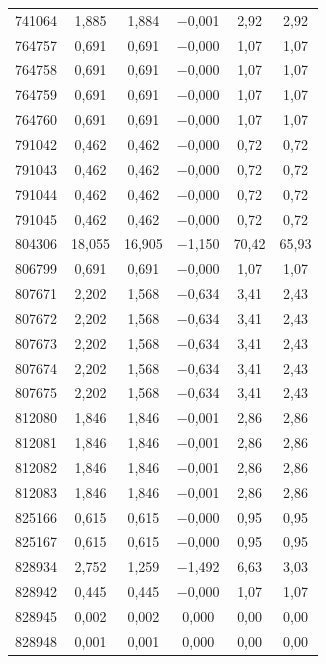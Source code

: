 \begin{longtable}{lccccc}
741064 & 1,885 & 1,884 & $-$0,001 & 2,92 & 2,92 \\
764757 & 0,691 & 0,691 & $-$0,000 & 1,07 & 1,07 \\
764758 & 0,691 & 0,691 & $-$0,000 & 1,07 & 1,07 \\
764759 & 0,691 & 0,691 & $-$0,000 & 1,07 & 1,07 \\
764760 & 0,691 & 0,691 & $-$0,000 & 1,07 & 1,07 \\
791042 & 0,462 & 0,462 & $-$0,000 & 0,72 & 0,72 \\
791043 & 0,462 & 0,462 & $-$0,000 & 0,72 & 0,72 \\
791044 & 0,462 & 0,462 & $-$0,000 & 0,72 & 0,72 \\
791045 & 0,462 & 0,462 & $-$0,000 & 0,72 & 0,72 \\
804306 & 18,055 & 16,905 & $-$1,150 & 70,42 & 65,93 \\
806799 & 0,691 & 0,691 & $-$0,000 & 1,07 & 1,07 \\
807671 & 2,202 & 1,568 & $-$0,634 & 3,41 & 2,43 \\
807672 & 2,202 & 1,568 & $-$0,634 & 3,41 & 2,43 \\
807673 & 2,202 & 1,568 & $-$0,634 & 3,41 & 2,43 \\
807674 & 2,202 & 1,568 & $-$0,634 & 3,41 & 2,43 \\
807675 & 2,202 & 1,568 & $-$0,634 & 3,41 & 2,43 \\
812080 & 1,846 & 1,846 & $-$0,001 & 2,86 & 2,86 \\
812081 & 1,846 & 1,846 & $-$0,001 & 2,86 & 2,86 \\
812082 & 1,846 & 1,846 & $-$0,001 & 2,86 & 2,86 \\
812083 & 1,846 & 1,846 & $-$0,001 & 2,86 & 2,86 \\
825166 & 0,615 & 0,615 & $-$0,000 & 0,95 & 0,95 \\
825167 & 0,615 & 0,615 & $-$0,000 & 0,95 & 0,95 \\
828934 & 2,752 & 1,259 & $-$1,492 & 6,63 & 3,03 \\
828942 & 0,445 & 0,445 & $-$0,000 & 1,07 & 1,07 \\
828945 & 0,002 & 0,002 & 0,000 & 0,00 & 0,00 \\
828948 & 0,001 & 0,001 & 0,000 & 0,00 & 0,00 \\
\end{longtable}
\endgroup
